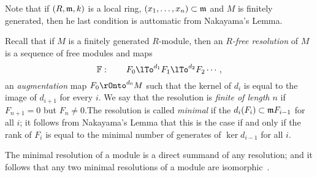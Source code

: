 Note that if $(R,\gm,k)$ is a local ring, $(x_{1},\dots,x_{n})\subset \gm$ and $M$ is finitely generated, then he last condition is auttomatic from Nakayama's Lemma.

 Recall
that if $M$ is a finitely generated $R$-module, then an \emph{$R$-free resolution} of $M$ is a sequence of free modules and maps
$$
\FF:\qquad F_{0} \lTo^{d_{1}} F_{1}\lTo^{d_{2}} F_{2}\cdots,
$$
an \emph{augmentation} map $F_{0} \rOnto^{d_{0}} M$ such that the kernel of $d_{i}$ is equal to the image of $d_{i+1}$ for every $i$. We say that the resolution is \emph{finite of length $n$} if $F_{n+1}= 0$ but $F_{n}\neq 0$.The resolution is called \emph{minimal} if the $d_{i}(F_{i}) \subset \gm F_{i-1}$ for all $i$; it follows from Nakayama's Lemma that this is the case if and only if the rank of $F_{i}$ is equal to the minimal
number of generates of $\ker d_{i-1}$ for all $i$. 

The minimal resolution of a module is a direct summand of any resolution; and it follows that any two minimal resolutions of a module are isomorphic~\cite[Theorem ***]{E}. 

